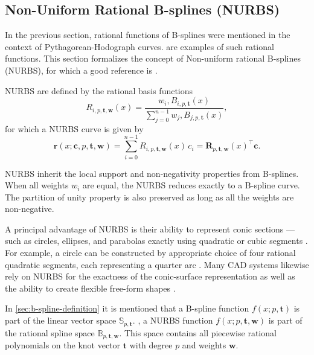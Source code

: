 \subsection{Non-Uniform Rational B-splines (NURBS)}
In the previous section, rational functions of B-splines were mentioned in the context of Pythagorean-Hodograph curves.  are examples of such rational functions. This section formalizes the concept of Non-uniform rational B-splines (NURBS), for which a good reference is \cite{Piegl1997}. 

NURBS are defined by the rational basis functions
\begin{equation}\label{eq:nurbs-basis}
R_{i,p,\mathbf t, \mathbf w}(x)  = \frac{w_i,B_{i,p,\mathbf t}(x)}{\sum_{j=0}^{n-1}w_j,B_{j,p,\mathbf t}(x)},
\end{equation}
for which a NURBS curve is given by
\begin{equation}\label{eq:nurbs-curve}
\mathbf r(x; \mathbf c, p, \mathbf t, \mathbf w)  = \sum_{i=0}^{n-1}R_{i,p,\mathbf t, \mathbf w}(x)\,c_i
= \mathbf R_{p,\mathbf t, \mathbf w}(x)^\top \mathbf c.
\end{equation}

NURBS inherit the local support and non-negativity properties from B-splines. When all weights $w_i$ are equal, the NURBS reduces exactly to a B-spline curve. The partition of unity property is also preserved as long as all the weights are non-negative. \citep{Piegl1997}

A principal advantage of NURBS is their ability to represent conic sections — such as circles, ellipses, and parabolas exactly using quadratic or cubic segments \citep{Piegl1997}. For example, a circle can be constructed by appropriate choice of four rational quadratic segments, each representing a quarter arc \citep{DenbighStarkeyNURBS}. Many CAD systems likewise rely on NURBS for the exactness of the conic-surface representation as well as the ability to create flexible free-form shapes \citep{Farin1991,PieglTillerSIGGRAPH,cottrell2009isogeometric}.

In \cref{sec:b-spline-definition} it is mentioned that a B-spline function $f(x; p, \mathbf t)$ is part of the linear vector space $\mathbb S_{p, \mathbf t}$.
, a NURBS function $f(x; p, \mathbf t, \mathbf w)$ is part of the rational spline space $\mathbb B_{p, \mathbf t, \mathbf w}$. This space contains all piecewise rational polynomials on the knot vector $\mathbf t$ with degree $p$ and weights $\mathbf w$. 

